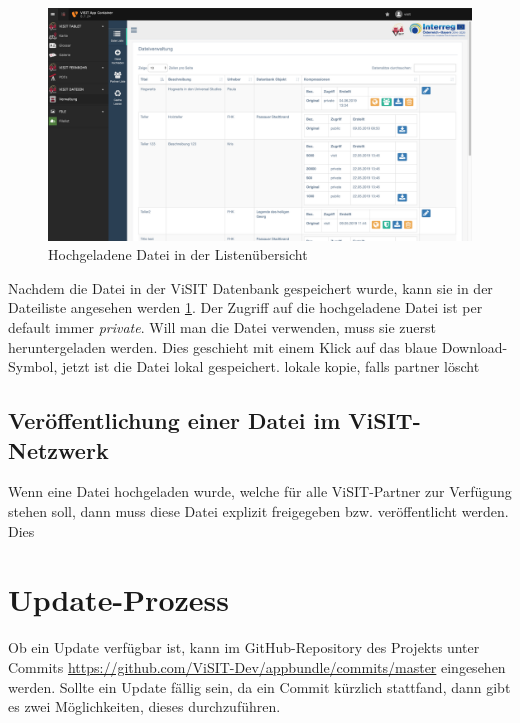\begin{figure}[ht!]
\centering
\includegraphics[width=12cm]{Figures/paula/dateiverwaltung/datei_in_listenuebersicht.png}
\caption{Hochgeladene Datei in der Listenübersicht}
\label{img:datei_in_listenuebersichtn}
\end{figure}

Nachdem die Datei in der ViSIT Datenbank gespeichert wurde, kann sie in der Dateiliste angesehen werden \ref{img:datei_in_listenuebersichtn}. Der Zugriff auf die hochgeladene Datei ist per default immer \textit{private}. Will man die Datei verwenden, muss sie zuerst heruntergeladen werden. Dies geschieht mit einem Klick auf das blaue Download-Symbol, jetzt ist die Datei lokal gespeichert. lokale kopie, falls partner löscht

\subsection{Veröffentlichung einer Datei im ViSIT-Netzwerk}

Wenn eine Datei hochgeladen wurde, welche für alle ViSIT-Partner zur Verfügung stehen soll, dann muss diese Datei explizit freigegeben bzw. veröffentlicht werden. Dies









\section{Update-Prozess}

Ob ein Update verfügbar ist, kann im GitHub-Repository des Projekts unter Commits \url{https://github.com/ViSIT-Dev/appbundle/commits/master} eingesehen werden. Sollte ein Update fällig sein, da ein Commit kürzlich stattfand, dann gibt es zwei Möglichkeiten, dieses durchzuführen.

